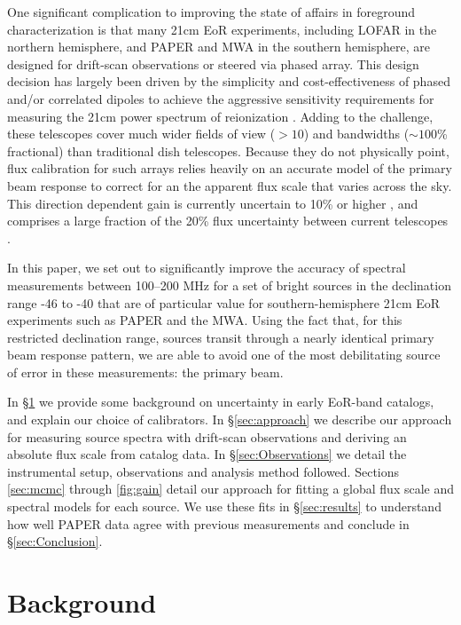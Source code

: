 \documentclass[preprint]{aastex}
\begin{document}
One significant complication to improving the state of affairs in foreground characterization
is that many 21cm EoR experiments, including LOFAR in the northern hemisphere, and
PAPER and MWA in the southern hemisphere, are designed for drift-scan observations or steered via phased array.
This design decision has largely been driven by the simplicity and cost-effectiveness of
phased and/or correlated dipoles to achieve the aggressive sensitivity requirements
for measuring the 21cm power spectrum of reionization \citep{Parsons:2012p9028,Beardsley:2013p9952,Jelic:2008p2130}.
Adding to the challenge, these telescopes 
cover much wider fields of view ($>10$\arcdeg) and bandwidths
($\sim 100$\% fractional) than traditional dish telescopes.
Because they do not physically point, flux calibration for such arrays relies heavily
on an accurate model of the primary beam response to correct for an
the apparent flux scale that varies across the sky.
This direction dependent gain is currently uncertain to 10\% or higher
\citep{Pober:2012p8800}, and comprises a large fraction of the 20\% flux uncertainty between current telescopes \citep{Jacobs:2013p9908}.


In this paper, we set out to significantly improve the accuracy of spectral measurements between 
100--200 MHz for a set of bright sources in the declination range -46\arcdeg{} to -40\arcdeg{} that
are of particular value for southern-hemisphere 21cm EoR experiments such as PAPER and the MWA.
Using the fact that, for this restricted declination range,
sources transit through a nearly identical primary beam response pattern, we are able to avoid one of the
most debilitating source of error in these measurements: the primary beam.  


In \S\ref{sec:background} we provide some background on uncertainty in early EoR-band catalogs,
and explain our choice of calibrators.
In \S\ref{sec:approach} we describe our approach for measuring source spectra with
drift-scan observations and deriving an absolute flux scale from catalog data.  
In \S\ref{sec:Observations} we detail the instrumental 
setup, observations and analysis method followed. Sections \ref{sec:mcmc} through
\ref{fig:gain} detail our approach for fitting a global flux scale and spectral models for each source.
We use these fits in \S\ref{sec:results} to understand how well PAPER data agree
with previous measurements and conclude in \S\ref{sec:Conclusion}.


\section{Background}
\label{sec:background}
\end{document}

